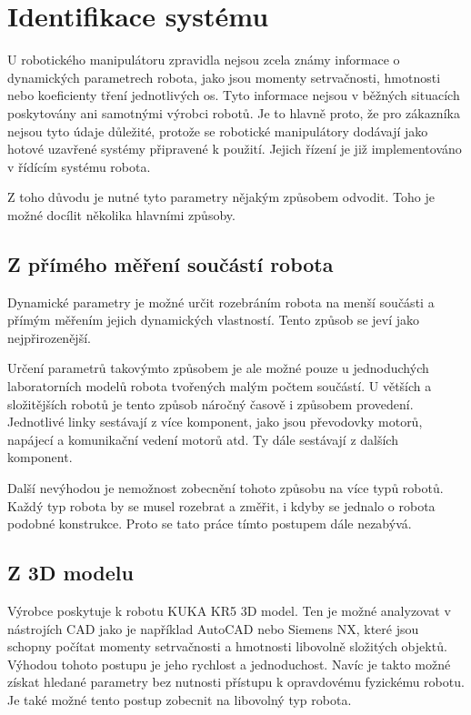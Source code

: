 

\chapter{Identifikace systému}

U robotického manipulátoru zpravidla nejsou zcela známy informace o dynamických parametrech robota, jako jsou momenty setrvačnosti, hmotnosti nebo koeficienty tření jednotlivých os. Tyto informace nejsou v běžných situacích poskytovány ani samotnými výrobci robotů. Je to hlavně proto, že pro zákazníka nejsou tyto údaje důležité, protože se robotické manipulátory dodávají jako hotové uzavřené systémy připravené k použití. Jejich řízení je již implementováno v řídícím systému robota.

Z toho důvodu je nutné tyto parametry nějakým způsobem odvodit. Toho je možné docílit několika hlavními způsoby.

\section{Z přímého měření součástí robota}

Dynamické parametry je možné určit rozebráním robota na menší součásti a přímým měřením jejich dynamických vlastností. Tento způsob se jeví jako nejpřirozenější.

Určení parametrů takovýmto způsobem je ale možné pouze u jednoduchých laboratorních modelů robota tvořených malým počtem součástí. U větších a složitějších robotů je tento způsob náročný časově i způsobem provedení. Jednotlivé linky sestávají z více komponent, jako jsou převodovky motorů, napájecí a komunikační vedení motorů atd. Ty dále sestávají z dalších komponent.

Další nevýhodou je nemožnost zobecnění tohoto způsobu na více typů robotů. Každý typ robota by se musel rozebrat a změřit, i kdyby se jednalo o robota podobné konstrukce.
Proto se tato práce tímto postupem dále nezabývá.    

\section{Z 3D modelu}

Výrobce poskytuje k robotu KUKA KR5 3D model. Ten je možné analyzovat v nástrojích CAD jako je například AutoCAD nebo Siemens NX, které jsou schopny počítat momenty setrvačnosti a hmotnosti libovolně složitých objektů. Výhodou tohoto postupu je jeho rychlost a jednoduchost. Navíc je takto možné získat hledané parametry bez nutnosti přístupu k opravdovému fyzickému robotu. Je také možné tento postup zobecnit na libovolný typ robota.
   
